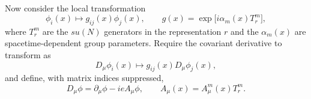 Now consider the local transformation
\begin{equation}
    \phi_i(x)\longmapsto g_{ij}(x)\phi_j(x),
    \qquad
    g(x)=\exp\!\bigl[i\alpha_m(x)T_r^m\bigr],
\end{equation}
where $T_r^m$ are the $su(N)$ generators in the representation $r$ and the
$\alpha_m(x)$ are spacetime-dependent group parameters. Require the covariant
derivative to transform as
\begin{equation}
    D_\mu\phi_i(x)\longmapsto g_{ij}(x)D_\mu\phi_j(x),
\end{equation}
and define, with matrix indices suppressed,
\begin{equation}
    D_\mu\phi=\partial_\mu\phi-ieA_\mu\phi,
    \qquad
    A_\mu(x)=A_\mu^m(x)T_r^m.
\end{equation}

